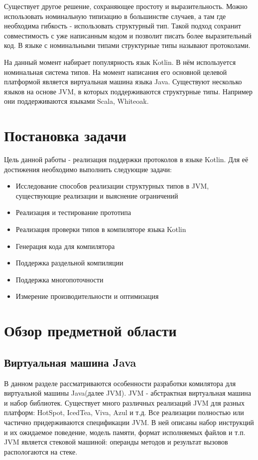 \documentclass{spbau-diploma}
\begin{document}
Существует другое решение, сохраняющее простоту и выразительность. Можно использовать номинальную типизацию в большинстве случаев, а там где необходима гибкость - использовать структурный тип. Такой подход сохранит совместимость с уже написанным кодом и позволит писать более выразительный код. В языке с номинальными типами структурные типы называют протоколами.

На данный момент набирает популярность язык Kotlin. В нём используется номинальная система типов. На момент написания его основной целевой платформой является виртуальная машина языка Java. Существуют несколько языков на основе JVM, в которых поддерживаются структурные типы. Например они поддерживаются языками Scala, Whiteoak.

\section*{Постановка задачи}
Цель данной работы - реализация поддержки протоколов в языке Kotlin. Для её достижения необходимо выполнить следующие задачи:
\begin{itemize}
    \item Исследование способов реализации структурных типов в JVM, существующие реализации и выяснение ограничений
    \item Реализация и тестирование прототипа
    \item Реализация проверки типов в компиляторе языка Kotlin
    \item Генерация кода для компилятора
    \item Поддержка раздельной компиляции
    \item Поддержка многопоточности
    \item Измерение производительности и оптимизация
\end{itemize}

\section{Обзор предметной области}
\subsection{Виртуальная машина Java}
В данном разделе рассматриваются особенности разработки комилятора для виртуальной машины Java(далее JVM). JVM - абстрактная виртуальная машина и набор библиотек. Существует много различных реализаций JVM для разных платформ: HotSpot, IcedTea, Viva, Azul и т.д. Все реализации полностью или частично придерживаются спецификации JVM. В ней описаны набор инструкций и их ожидаемое поведение, модель памяти, формат исполняемых файлов и т.п. JVM является стековой машиной: операнды методов и результат вызовов распологаются на стеке.
\end{document}

